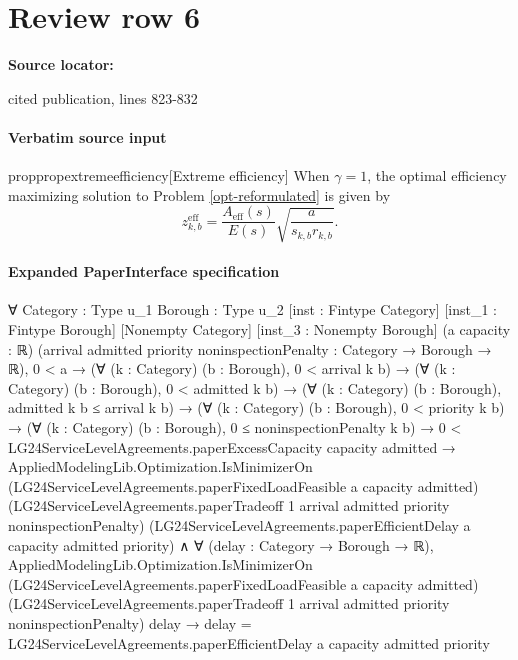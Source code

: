 \documentclass[10pt]{article}
\begin{document}
\section*{Review row 6}
\textbf{Source locator:} {\footnotesize\raggedright cited publication, lines 823-\allowbreak{}832\par}
\paragraph{Verbatim source input}
\begin{ReviewVerbatim}
\begin{restatable}{prop}{propextremeefficiency}[Extreme efficiency]
\label{prop:extremeeff}
When $\gamma=1$, the optimal efficiency maximizing solution to Problem \eqref{opt-reformulated} {is given by}
\begin{equation}
    {z^{\mathrm{eff}}_{k,b}
      =\frac{{A_{\mathrm{eff}}(s)}}{E(s)}
      \sqrt{\frac{a}{s_{k,b}r_{k,b}}}.}
      \label{eq:fixed-load-efficient-endpoint}
\end{equation}
\end{restatable}
\end{ReviewVerbatim}



\paragraph{Expanded PaperInterface specification}
\begin{ReviewVerbatim}
∀ {Category : Type u_1} {Borough : Type u_2} [inst : Fintype Category] [inst_1 : Fintype Borough] [Nonempty Category]
  [inst_3 : Nonempty Borough] (a capacity : ℝ)
  (arrival admitted priority noninspectionPenalty : Category → Borough → ℝ),
  0 < a →
    (∀ (k : Category) (b : Borough), 0 < arrival k b) →
      (∀ (k : Category) (b : Borough), 0 < admitted k b) →
        (∀ (k : Category) (b : Borough), admitted k b ≤ arrival k b) →
          (∀ (k : Category) (b : Borough), 0 < priority k b) →
            (∀ (k : Category) (b : Borough), 0 ≤ noninspectionPenalty k b) →
              0 < LG24ServiceLevelAgreements.paperExcessCapacity capacity admitted →
                AppliedModelingLib.Optimization.IsMinimizerOn
                    (LG24ServiceLevelAgreements.paperFixedLoadFeasible a capacity admitted)
                    (LG24ServiceLevelAgreements.paperTradeoff 1 arrival admitted priority noninspectionPenalty)
                    (LG24ServiceLevelAgreements.paperEfficientDelay a capacity admitted priority) ∧
                  ∀ (delay : Category → Borough → ℝ),
                    AppliedModelingLib.Optimization.IsMinimizerOn
                        (LG24ServiceLevelAgreements.paperFixedLoadFeasible a capacity admitted)
                        (LG24ServiceLevelAgreements.paperTradeoff 1 arrival admitted priority noninspectionPenalty)
                        delay →
                      delay = LG24ServiceLevelAgreements.paperEfficientDelay a capacity admitted priority
\end{ReviewVerbatim}
\end{document}

